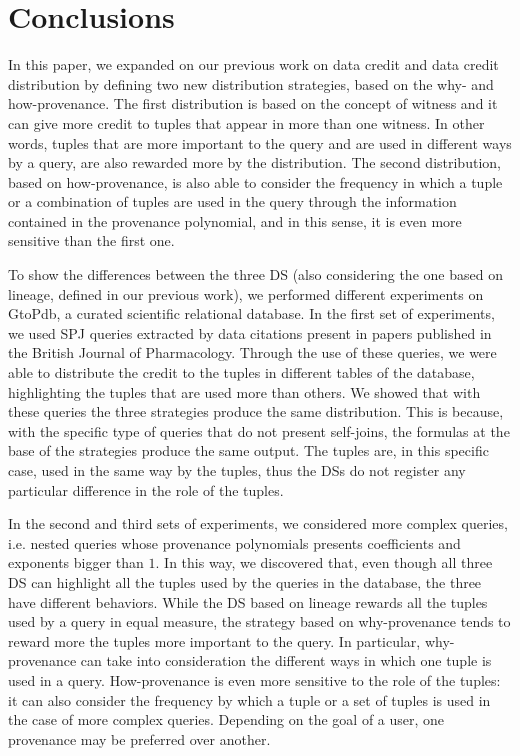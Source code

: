 \section{Conclusions}
\label{section:conclusions}

In this paper, we expanded on our previous work on data credit and data credit distribution by defining two new distribution strategies, based on the why- and how-provenance. 
The first distribution is based on the concept of witness and it can give more credit to tuples that appear in more than one witness. 
In other words, tuples that are more important to the query and are used in different ways by a query, are also rewarded more by the distribution.
The second distribution, based on how-provenance, is also able to consider the frequency in which a tuple or a combination of tuples are used in the query through the information contained in the provenance polynomial, and in this sense, it is even more sensitive than the first one.

To show the differences between the three DS (also considering the one based on lineage, defined in our previous work), we performed different experiments on GtoPdb, a curated scientific relational database. 
In the first set of experiments, we used SPJ queries extracted by data citations present in papers published in the British Journal of Pharmacology. 
Through the use of these queries, we were able to distribute the credit to the tuples in different tables of the database, highlighting the tuples that are used more than others. 
We showed that with these queries the three strategies produce the same distribution. This is because, with the specific type of queries that do not present self-joins, the formulas at the base of the strategies produce the same output. The tuples are, in this specific case, used in the same way by the tuples, thus the DSs do not register any particular difference in the role of the tuples.

In the second and third sets of experiments, we considered more complex queries, i.e. nested queries whose provenance polynomials presents coefficients and exponents bigger than $1$.
In this way, we discovered that, even though all three DS can highlight all the tuples used by the queries in the database, the three have different behaviors. 
While the DS based on lineage rewards all the tuples used by a query in equal measure, the strategy based on why-provenance tends to reward more the tuples more important to the query. 
In particular, why-provenance can take into consideration the different ways in which one tuple is used in a query.  
How-provenance is even more sensitive to the role of the tuples: it can also consider the frequency by which a tuple or a set of tuples is used in the case of more complex queries. Depending on the goal of a user, one provenance may be preferred over another. 

